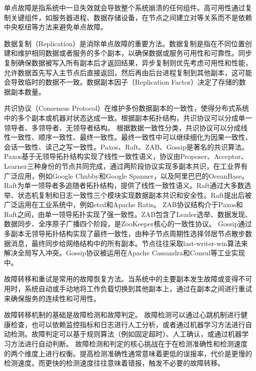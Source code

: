 单点故障是指系统中一旦失效就会导致整个系统崩溃的任何组件。高可用性通过复制关键组件，如服务器进程、数据存储设备，在节点之间建立对等关系而不是依赖中央枢纽等方法来避免单点故障。

数据复制（Replication）是消除单点故障的重要方法。数据复制是指在不同位置创建和维护相同数据或者服务的多个副本，以确保数据或服务可用性和可靠性。同步复制确保数据被写入所有副本后才返回结果，异步复制则优先考虑可用性和性能，允许数据首先写入主节点后直接返回，然后再由后台进程复制到其他副本，这可能会导致临时的数据不一致。数据副本因子（Replication Factor）决定了存储的数据副本数量。


共识协议（Consensus Protocol）在维护多份数据副本的一致性，使得分布式系统中的多个副本或机器对状态达成一致。根据副本拓扑结构，共识协议可以分成单一领导者、多领导者、无领导者结构。
根据数据一致性分类，共识协议可以分成线性一致性\cite{herlihy1990linearizability}、顺序一致性\cite{attiya1994sequential}、最终一致性\cite{bailis2013eventual}。最终一致性中可以继续细化为因果一致性\cite{lloyd2011cops}、会话一致性\cite{mortazavi2018session}、读己之写一致性\cite{nishtala2013memcached}。Paxos、Raft、ZAB、Gossip是著名的共识算法。
Paxos\cite{lamport2001paxos}基于无领导拓扑结构实现了线性一致性语义，协议由Proposer、Acceptor、Learner三种身份的节点共同完成，通过两阶段协议实现多副本共识，在工业界有广泛应用，例如Google Chubby\cite{burrows2006chubby}和Google Spanner\cite{corbett2013spanner}，以及阿里巴巴的OceanBase\cite{zhen2014oceanbase}。
Raft\cite{ongaro2014raft}为单一领导者多追随者拓扑结构，提供了线性一致性语义。Raft通过大多数选举、状态机复制和日志一致性三个模块实现数据副本共识和安全性。Raft提出后被广泛运用在工业系统中，例如etcd\cite{etcd}和Apache Ratis\cite{ratis}。
ZAB\cite{junqueira2011zab}协议结构介于Paxos和Raft之间，由单一领导拓扑实现了强一致性。ZAB包含了Leader选举、数据发现、数据同步、全序原子广播四个阶段，是ZooKeeper\cite{hunt2010zookeeper}核心的一致性协议。
Gossip\cite{demers1987gossip}通过多副本无领导拓扑结构实现了最终一致性，由种子节点周期性选择邻居节点散步数据消息，最终同步给网络结构中的所有副本。节点往往采取last-writer-win算法来解决全局写入冲突。Gossip协议被运用在Apache Cassandra\cite{lakshman2010cassandra}和Consul\cite{mishra1993consul}等工业实现中。


故障转移和重试是常用的故障恢复方法。当系统中的主要副本发生故障或变得不可用时，系统自动或手动地将工作负载切换到其他副本上，通过在副本之间进行重试来确保服务的连续性和可用性。

故障转移机制的基础是故障检测和故障判定。
故障检测可以通过心跳机制进行健康检查，也可以依赖监控指标和日志进行人工分析，或者通过机器学习方法进行自动检测。故障判定可以基于规则算法（例如固定超时）、人工确认，或通过机器学习方法进行自动判断。
故障检测和判定的核心挑战在于在检测准确性和检测速度的两个维度上进行权衡。提高检测准确性通常意味着更低的误报率，代价是更慢的检测速度。而更快的检测速度往往意味着错报，触发不必要的故障转移。

